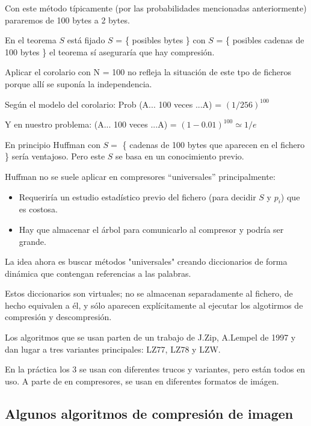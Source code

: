 	Con este método típicamente (por las probabilidades mencionadas anteriormente) pararemos de 100 bytes a 2 bytes.

	En el teorema $S$ está fijado $S$ = \{ posibles bytes \} con $S$ = \{ posibles cadenas de 100 bytes \} el teorema sí aseguraría que hay compresión.

	\begin{obs} Aplicar el corolario con N = 100 no refleja la situación de este tpo de ficheros porque allí se suponía la independencia.

	Según el modelo del corolario: Prob (A... 100 veces ...A) = $(1/256)^{100}$

	Y en nuestro problema: (A... 100 veces ...A) = $(1 - 0.01)^{100} \simeq{1/e}$

	\end{obs}

	En principio Huffman con $S =$ \{ cadenas de 100 bytes que aparecen en el fichero \} sería ventajoso. Pero este $S$ se basa en un conocimiento previo.

	Huffman no se suele aplicar en compresores ``universales'' principalmente:

	\begin{itemize}
		\item Requeriría un estudio estadístico previo del fichero (para decidir $S$ y $p_i$) que es costosa.

		\item Hay que almacenar el árbol para comunicarlo al compresor y podría ser grande.

	\end{itemize}
La idea ahora es buscar métodos "universales" creando diccionarios de forma dinámica que contengan referencias a las palabras.

Estos diccionarios son virtuales; no se almacenan separadamente al fichero, de hecho equivalen a él, y sólo aparecen explícitamente al ejecutar los algotirmos de compresión y descompresión.


	Los algoritmos que se usan parten de un trabajo de J.Zip, A.Lempel de 1997 y dan lugar a tres variantes principales: LZ77, LZ78 y LZW.

	En la práctica los 3 se usan con diferentes trucos y variantes, pero están todos en uso. A parte de en compresores, se usan en diferentes formatos de imágen.

	\subsection{Algunos algoritmos de compresión de imagen}

